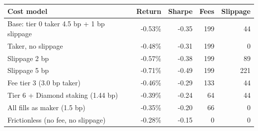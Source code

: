 \begin{tabular}{lrrrr}
\toprule
Cost model & Return & Sharpe & Fees & Slippage \\
\midrule
Base: tier 0 taker 4.5 bp + 1 bp slippage & -0.53\% & -0.35 & 199 & 44 \\
Taker, no slippage & -0.48\% & -0.31 & 199 & 0 \\
Slippage 2 bp & -0.57\% & -0.38 & 199 & 89 \\
Slippage 5 bp & -0.71\% & -0.49 & 199 & 221 \\
Fee tier 3 (3.0 bp taker) & -0.46\% & -0.29 & 133 & 44 \\
Tier 6 + Diamond staking (1.44 bp) & -0.39\% & -0.24 & 64 & 44 \\
All fills as maker (1.5 bp) & -0.35\% & -0.20 & 66 & 0 \\
Frictionless (no fee, no slippage) & -0.28\% & -0.15 & 0 & 0 \\
\bottomrule
\end{tabular}